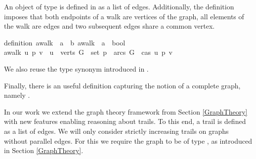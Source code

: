\begin{isabellebody}
\begin{isamarkuptext}
An object of type  is defined in  as a list of edges. 
Additionally, the definition  imposes that both endpoints of a walk are vertices of 
the graph, all elements of the walk are edges and two subsequent edges share a common vertex. \vspace{1em}

\noindent{}

%
\begin{isabelle}%
definition\ awalk\ {\isacharcolon}{\isacharcolon}\ {\isachardoublequote}{\isacharprime}a\ {\isasymRightarrow}\ {\isacharprime}b\ awalk\ {\isasymRightarrow}\ {\isacharprime}a\ {\isasymRightarrow}\ bool{\isachardoublequote}\isanewline
{\isachardoublequote}awalk\ u\ p\ v\ {\isasymequiv}\ u\ {\isasymin}\ verts\ G\ {\isasymand}\ set\ p\ {\isasymsubseteq}\ arcs\ G\ {\isasymand}\ cas\ u\ p\ v{\isachardoublequote}\ %
\end{isabelle}

\noindent We also reuse the type synonym  introduced in \mbox{}. \vspace{1em}

  \vspace{1em}

Finally, there is an useful definition capturing the notion of a complete graph, namely .%
\end{isamarkuptext}\isamarkuptrue%
%
\isadelimdocument
%
\endisadelimdocument
%
\isatagdocument
%
\isamarkuptrue%
%
\endisatagdocument
{\isafolddocument}%
%
\isadelimdocument
%
\endisadelimdocument
%
\begin{isamarkuptext}%
\label{Formalization}%
\end{isamarkuptext}\isamarkuptrue%
%
\isadelimdocument
%
\endisadelimdocument
%
\isatagdocument
%
\isamarkuptrue%
%
\endisatagdocument
{\isafolddocument}%
%
\isadelimdocument
%
\endisadelimdocument
%
\begin{isamarkuptext}%
\label{trails} In our work we extend the graph theory framework from Section \ref{GraphTheory} 
with new features enabling reasoning about trails. To this end,
 a trail is defined as a list of edges. We will only consider strictly increasing trails 
on graphs without parallel edges. For this we require the graph 
to be of type , as introduced in Section \ref{GraphTheory}. 


\end{isamarkuptext}
\end{isabellebody}

